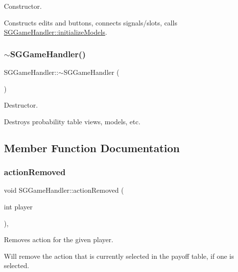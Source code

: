 Constructor. 

Constructs edits and buttons, connects signals/slots, calls \hyperlink{classSGGameHandler_af80ac7a33ba124153e2be5528dbce4b7}{S\+G\+Game\+Handler\+::initialize\+Models}. \mbox{\label{classSGGameHandler_a98ffa14cea717acb76411e0caceddbf7}} 
\subsubsection{\texorpdfstring{$\sim$\+S\+G\+Game\+Handler()}{~SGGameHandler()}}
{\footnotesize\ttfamily S\+G\+Game\+Handler\+::$\sim$\+S\+G\+Game\+Handler (\begin{DoxyParamCaption}{ }\end{DoxyParamCaption})}



Destructor. 

Destroys probability table views, models, etc. 

\subsection{Member Function Documentation}
\mbox{\label{classSGGameHandler_aed866fdb5315e2a593f659206eabbef3}} 
\subsubsection{\texorpdfstring{action\+Removed}{actionRemoved}}
{\footnotesize\ttfamily void S\+G\+Game\+Handler\+::action\+Removed (\begin{DoxyParamCaption}\item[{int}]{player }\end{DoxyParamCaption})\hspace{0.3cm}{\ttfamily [private]}, {\ttfamily [slot]}}



Removes action for the given player. 

Will remove the action that is currently selected in the payoff table, if one is selected. \mbox{\label{classSGGameHandler_af80ac7a33ba124153e2be5528dbce4b7}} 
